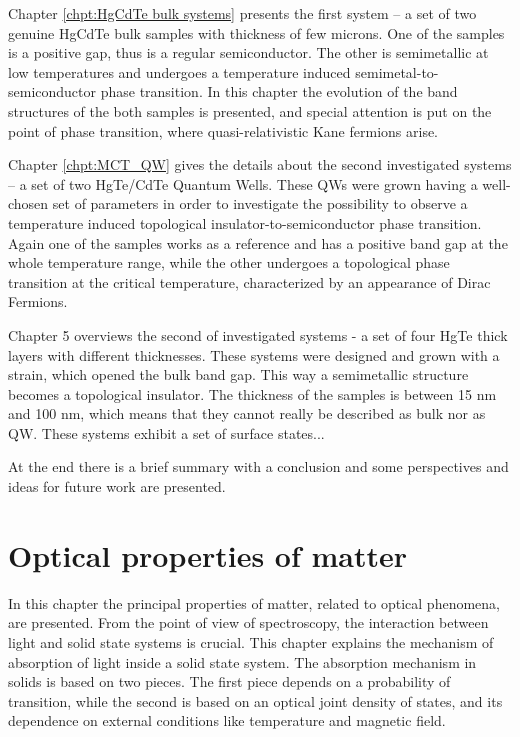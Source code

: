 \documentclass[titlepage,a4paper]{book}
\newcommand{\wciecie}{\quad\phantom{v}}
\begin{document}
Chapter \ref{chpt:HgCdTe bulk systems} presents the first system -- a set of two genuine HgCdTe bulk samples with thickness of few microns. One of the samples is a positive gap, thus is a regular semiconductor. The other is semimetallic at low temperatures and undergoes a temperature induced semimetal-to-semiconductor phase transition. In this chapter the evolution of the band structures of the both samples is presented, and special attention is put on the point of phase transition, where quasi-relativistic Kane fermions arise.   

Chapter \ref{chpt:MCT_QW} gives the details about the second investigated systems -- a set of two HgTe/CdTe Quantum Wells. These QWs were grown having a well-chosen set of parameters in order to investigate the possibility to observe a temperature induced topological insulator-to-semiconductor phase transition. Again one of the samples works as a reference and has a positive band gap at the whole temperature range, while the other undergoes a topological phase transition at the critical temperature, characterized by an appearance of Dirac Fermions.

Chapter 5 overviews the second of investigated systems - a set of four HgTe thick layers with different thicknesses. These systems were designed and grown with a strain, which opened the bulk band gap. This way a semimetallic structure becomes a topological insulator. The thickness of the samples is between 15 nm and 100 nm, which means that they cannot really be described as bulk nor as QW. These systems exhibit a set of surface states... 

At the end there is a brief summary with a conclusion and some perspectives and ideas for future work are presented.

\chapter{Optical properties of matter}
\label{chpt:optical}
\wciecie
In this chapter the principal properties of matter, related to optical phenomena, are presented. From the point of view of spectroscopy, the interaction between light and solid state systems is crucial. This chapter explains the mechanism of absorption of light inside a solid state system. The absorption mechanism in solids is based on two pieces. The first piece depends on a probability of transition, while the second is based on an optical joint density of states, and its dependence on external conditions like temperature and magnetic field. 
\end{document}
